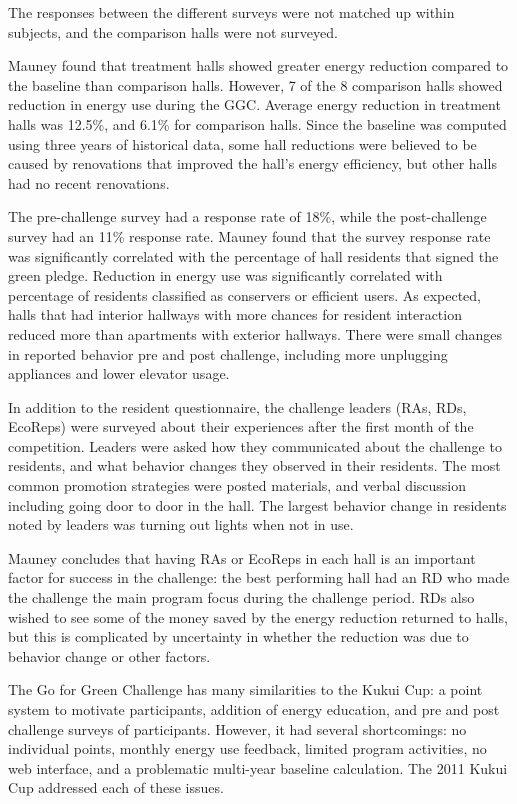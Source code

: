 The responses between the different surveys were not matched up within subjects, and the comparison halls were not surveyed.

Mauney found that treatment halls showed greater energy reduction compared to the baseline than comparison halls. However, 7 of the 8 comparison halls showed reduction in energy use during the GGC. Average energy reduction in treatment halls was 12.5\%, and 6.1\% for comparison halls. Since the baseline was computed using three years of historical data, some hall reductions were believed to be caused by renovations that improved the hall's energy efficiency, but other halls had no recent renovations.

The pre-challenge survey had a response rate of 18\%, while the post-challenge survey had an 11\% response rate. Mauney found that the survey response rate was significantly correlated with the percentage of hall residents that signed the green pledge. Reduction in energy use was significantly correlated with percentage of residents classified as conservers or efficient users. As expected, halls that had interior hallways with more chances for resident interaction reduced more than apartments with exterior hallways. There were small changes in reported behavior pre and post challenge, including more unplugging appliances and lower elevator usage.

In addition to the resident questionnaire, the challenge leaders (RAs, RDs, EcoReps) were surveyed about their experiences after the first month of the competition. Leaders were asked how they communicated about the challenge to residents, and what behavior changes they observed in their residents. The most common promotion strategies were posted materials, and verbal discussion including going door to door in the hall. The largest behavior change in residents noted by leaders was turning out lights when not in use.

Mauney concludes that having RAs or EcoReps in each hall is an important factor for success in the challenge: the best performing hall had an RD who made the challenge the main program focus during the challenge period. RDs also wished to see some of the money saved by the energy reduction returned to halls, but this is complicated by uncertainty in whether the reduction was due to behavior change or other factors.

The Go for Green Challenge has many similarities to the Kukui Cup: a point system to motivate participants, addition of energy education, and pre and post challenge surveys of participants. However, it had several shortcomings: no individual points, monthly energy use feedback, limited program activities, no web interface, and a problematic multi-year baseline calculation. The 2011 Kukui Cup addressed each of these issues.


